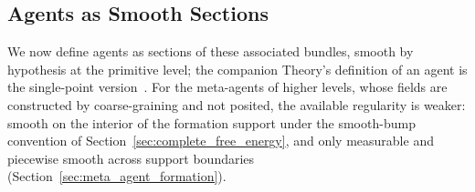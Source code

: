 \documentclass[11pt]{article}
\begin{document}
\subsection{Agents as Smooth Sections}
\label{sec:agent_definition}

We now define agents as sections of these associated bundles, smooth by hypothesis at the primitive level; the companion Theory's definition of an agent is the single-point version~\cite[Ch.~2]{DennisGaugeVFE2026}. For the meta-agents of higher levels, whose fields are constructed by coarse-graining and not posited, the available regularity is weaker: smooth on the interior of the formation support under the smooth-bump convention of Section~\ref{sec:complete_free_energy}, and only measurable and piecewise smooth across support boundaries (Section~\ref{sec:meta_agent_formation}).
\end{document}
